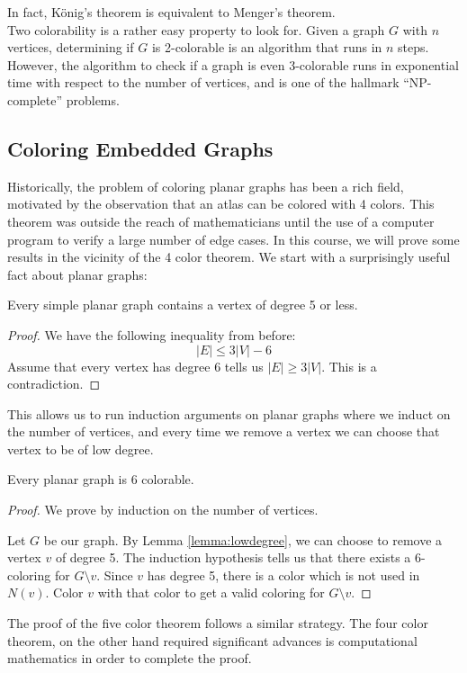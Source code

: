 In fact, K\"onig's theorem is equivalent to Menger's theorem. \\
Two colorability is a rather easy property to look for. Given a graph $G$ with $n$ vertices, determining if $G$ is 2-colorable is an algorithm that runs in $n$ steps. However, the algorithm to check if a graph is even 3-colorable runs in exponential time with respect to the number of vertices, and is one of the hallmark ``NP-complete'' problems. 


\subsection{Coloring Embedded Graphs}
Historically, the problem of coloring planar graphs has been a rich field, motivated by the observation that an atlas can be colored with 4 colors. This theorem was outside the reach of mathematicians until the use of a computer program to verify a large number of edge cases. In this course, we will prove some results in the vicinity of the 4 color theorem. We start with a surprisingly useful fact about planar graphs:
\begin{lemma}
 Every simple planar graph contains a vertex of degree 5 or less.\label{lemma:lowdegree}
\end{lemma}
\begin{proof}
 We have the following inequality from before:
 \[|E|\leq 3|V|-6\]
 Assume that every vertex has degree 6 tells us $|E|\geq 3|V|$. This is a contradiction. 
\end{proof}
This allows us to run induction arguments on planar graphs where we induct on the number of vertices, and every time we remove a vertex we can choose that vertex to be of low degree. 
\begin{corollary}
 Every planar graph is 6 colorable. 
\end{corollary}
\begin{proof}
 We prove by induction on the number of vertices. 
 
 Let $G$ be our graph. By Lemma \ref{lemma:lowdegree}, we can  choose to remove a vertex $v$ of degree 5. The induction hypothesis tells us that there exists a 6-coloring for $G\setminus v$. Since $v$ has degree 5, there is a color which is not used in $N(v)$. Color $v$ with that color to get a valid coloring for $G\setminus v$. 
\end{proof}

The proof of the five color theorem follows a similar strategy. The four color theorem, on the other hand required significant advances is computational mathematics in order to complete the proof. 
